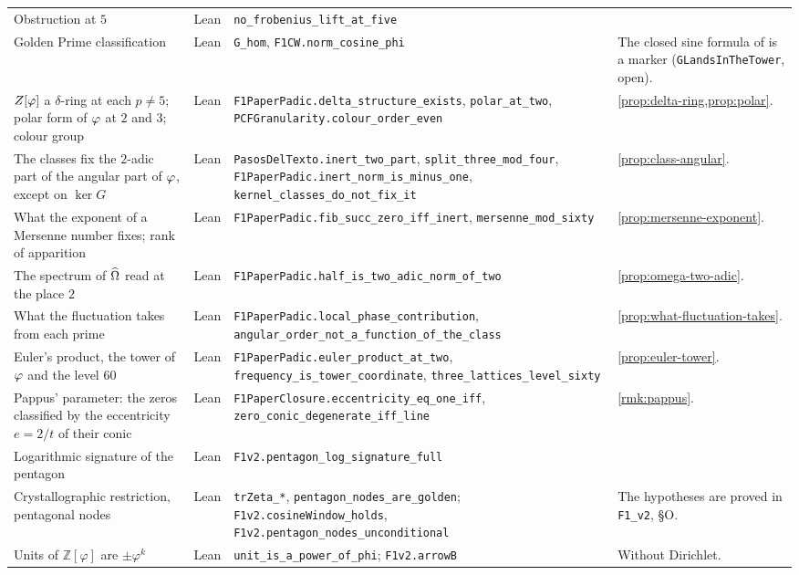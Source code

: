 {\begin{longtable}{>{\raggedright\arraybackslash}p{}>{\raggedright\arraybackslash}p{}>{\raggedright\arraybackslash}p{}>{\raggedright\arraybackslash}p{}}
Obstruction at $5$ & Lean & \texttt{no\_frobenius\_lift\_at\_five} & \\
Golden Prime classification & Lean & \texttt{G\_hom}, \texttt{F1CW.norm\_cosine\_phi} & The closed sine formula of \cite{grisales25} is a marker (\texttt{GLandsInTheTower}, open).\\
$Z[\varphi]$ a $\delta$-ring at each $p\ne5$; polar form of $\varphi$ at $2$ and $3$; colour group & Lean & \texttt{F1PaperPadic.delta\_structure\_exists}, \texttt{polar\_at\_two}, \texttt{PCFGranularity.colour\_order\_even} & \cref{prop:delta-ring,prop:polar}.\\
The classes fix the $2$-adic part of the angular part of $\varphi$, except on $\ker G$ & Lean & \texttt{PasosDelTexto.inert\_two\_part}, \texttt{split\_three\_mod\_four}, \texttt{F1PaperPadic.inert\_norm\_is\_minus\_one}, \texttt{kernel\_classes\_do\_not\_fix\_it} & \cref{prop:class-angular}.\\
What the exponent of a Mersenne number fixes; rank of apparition & Lean & \texttt{F1PaperPadic.fib\_succ\_zero\_iff\_inert}, \texttt{mersenne\_mod\_sixty} & \cref{prop:mersenne-exponent}.\\
The spectrum of $\widehat{\Omega}$ read at the place $2$ & Lean & \texttt{F1PaperPadic.half\_is\_two\_adic\_norm\_of\_two} & \cref{prop:omega-two-adic}.\\
What the fluctuation takes from each prime & Lean & \texttt{F1PaperPadic.local\_phase\_contribution}, \texttt{angular\_order\_not\_a\_function\_of\_the\_class} & \cref{prop:what-fluctuation-takes}.\\
Euler's product, the tower of $\varphi$ and the level $60$ & Lean & \texttt{F1PaperPadic.euler\_product\_at\_two}, \texttt{frequency\_is\_tower\_coordinate}, \texttt{three\_lattices\_level\_sixty} & \cref{prop:euler-tower}.\\
Pappus' parameter: the zeros classified by the eccentricity $e=2/t$ of their conic & Lean & \texttt{F1PaperClosure.eccentricity\_eq\_one\_iff}, \texttt{zero\_conic\_degenerate\_iff\_line} & \cref{rmk:pappus}.\\
Logarithmic signature of the pentagon & Lean & \texttt{F1v2.pentagon\_log\_signature\_full} & \\
Crystallographic restriction, pentagonal nodes & Lean & \texttt{trZeta\_*}, \texttt{pentagon\_nodes\_are\_golden}; \texttt{F1v2.cosineWindow\_holds}, \texttt{F1v2.pentagon\_nodes\_unconditional} & The hypotheses are proved in \texttt{F1\_v2}, \S O.\\
Units of $\mathbb Z[\varphi]$ are $\pm\varphi^k$ & Lean & \texttt{unit\_is\_a\_power\_of\_phi}; \texttt{F1v2.arrowB} & Without Dirichlet.\\

\end{longtable}}

